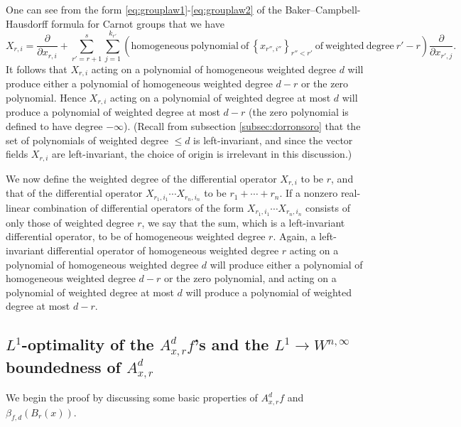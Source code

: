 \documentclass[11pt,reqno]{amsart}
\newcommand{\1}{\mathbf 1}
\begin{document}
One can see from the form \eqref{eq:grouplaw1}-\eqref{eq:grouplaw2} of the Baker--Campbell-Hausdorff formula for Carnot groups that we have
\[
X_{r,i}=\frac{\partial}{\partial x_{r,i}}+\sum_{r'=r+1}^s\sum_{j=1}^{k_{r'}}\left(\mathrm{homogeneous~polynomial~of~}\left\{x_{r'',i''}\right\}_{r''<r'}\mathrm{~of~weighted~degree~}r'-r\right)\frac{\partial}{\partial x_{r',j}}.
\]
It follows that $X_{r,i}$ acting on a polynomial of homogeneous weighted degree $d$ will produce either a polynomial of homogeneous weighted degree $d-r$ or the zero polynomial. Hence $X_{r,i}$ acting on a polynomial of weighted degree at most $d$ will produce a polynomial of weighted degree at most $d-r$ (the zero polynomial is defined to have degree $-\infty$). (Recall from subsection \ref{subsec:dorronsoro} that the set of polynomials of weighted degree $\le d$ is left-invariant, and since the vector fields $X_{r,i}$ are left-invariant, the choice of origin is irrelevant in this discussion.) 

We now define the weighted degree of the differential operator $X_{r,i}$ to be $r$, and that of the differential operator $X_{r_1,i_1}\cdots X_{r_n,i_n}$ to be $r_1+\cdots+r_n$. If a nonzero real-linear combination of differential operators of the form $X_{r_1,i_1}\cdots X_{r_n,i_n}$ consists of only those of weighted degree $r$, we say that the sum, which is a left-invariant differential operator, to be of homogeneous weighted degree $r$. Again, a left-invariant differential operator of homogeneous weighted degree $r$ acting on a polynomial of homogeneous weighted degree $d$ will produce either a polynomial of homogeneous weighted degree $d-r$ or the zero polynomial, and acting on a polynomial of weighted degree at most $d$ will produce a polynomial of weighted degree at most $d-r$.




\subsection{$L^1$-optimality of the $A^d_{x,r}f$'s and the $L^1\to W^{n,\infty}$ boundedness of $A^d_{x,r}$}
We begin the proof by discussing some basic properties of $A^d_{x,r}f$ and $\beta_{f,d}\left(B_r\left(x\right)\right)$.
\end{document}
